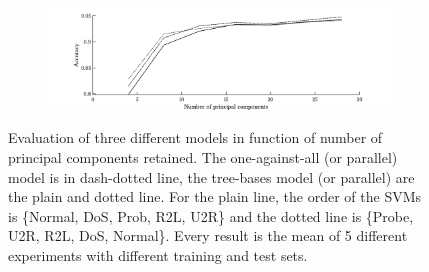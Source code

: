 \begin{figure}[h!]
        \begin{subfigure}[b]{1\textwidth}  
            \centering 
            \includegraphics[width=.98\textwidth]{parts/chap-4/img-svm/pca-acc.png}
        \end{subfigure}
        \caption[Comparison of PCA-LSVM models.]{Evaluation of three different models in function of number of principal components retained. The one-against-all (or parallel) model is in dash-dotted line, the tree-bases model (or parallel) are the plain and dotted line. For the plain line, the order of the SVMs is \{Normal, DoS, Prob, R2L, U2R\} and the dotted line is \{Probe, U2R, R2L, DoS, Normal\}. Every result is the mean of 5 different experiments with different training and test sets.}
        \label{fig:svm-pca}
\end{figure}

